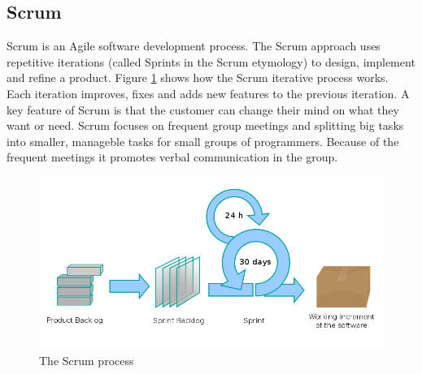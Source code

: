 \subsection{Scrum} 
\label{section:scrum}
Scrum is an Agile software development process. The Scrum approach uses repetitive iterations (called
Sprints in the Scrum etymology) to design, implement and refine a product. Figure \ref{fig:designmodel-scrum} shows
how the Scrum iterative process works. Each iteration improves, fixes and adds new features to the previous iteration.
A key feature of Scrum is that the customer can change their mind on what they want or need. Scrum focuses on frequent 
group meetings and splitting big tasks into smaller, manageble tasks for small groups of programmers. Because of the
frequent meetings it promotes verbal communication in the group.
\begin{figure}[h!]
\centering \includegraphics[scale=0.4]{img/designmodel-scrum}
\caption{The Scrum process~\cite{link:wiki}}
\label{fig:designmodel-scrum}
\end{figure}

